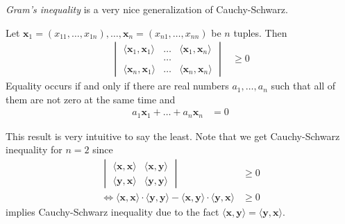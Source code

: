 \documentclass{subfile}
\begin{document}
	\emph{Gram's inequality} is a very nice generalization of Cauchy-Schwarz.
		\begin{theorem}
			Let $\mathbf{x}_1=(x_{11},\ldots,x_{1n}),\ldots,\mathbf{x}_n=(x_{n1},\ldots,x_{nn})$ be $n$ tuples. Then
				\begin{align*}
					\begin{vmatrix}
						\langle \mathbf{x}_1,\mathbf{x}_1\rangle & \ldots & \langle \mathbf{x}_1,\mathbf{x}_n\rangle\\
						& \ldots & \\
						\langle \mathbf{x}_n,\mathbf{x}_1\rangle & \ldots & \langle \mathbf{x}_n,\mathbf{x}_n\rangle
					\end{vmatrix}
						& \geq0
				\end{align*}
			Equality occurs if and only if there are real numbers $a_1,\ldots,a_n$ such that all of them are not zero at the same time and
				\begin{align*}
					a_1\mathbf{x}_1+\ldots+a_n\mathbf{x}_n
						& = 0
				\end{align*}
		\end{theorem}
	This result is very intuitive to say the least. Note that we get Cauchy-Schwarz inequality for $n=2$ since
		\begin{align*}
			\begin{vmatrix}
				\langle\mathbf{x},\mathbf{x}\rangle & \langle\mathbf{x},\mathbf{y}\rangle\\
				\langle\mathbf{y},\mathbf{x}\rangle & \langle\mathbf{y},\mathbf{y}\rangle
			\end{vmatrix}
				& \geq0\\
			\iff\langle\mathbf{x},\mathbf{x}\rangle\cdot\langle\mathbf{y},\mathbf{y}\rangle-\langle\mathbf{x},\mathbf{y}\rangle\cdot\langle\mathbf{y},\mathbf{x}\rangle
				& \geq0
		\end{align*}
	implies Cauchy-Schwarz inequality due to the fact $\langle\mathbf{x},\mathbf{y}\rangle=\langle\mathbf{y},\mathbf{x}\rangle$.
\end{document}
